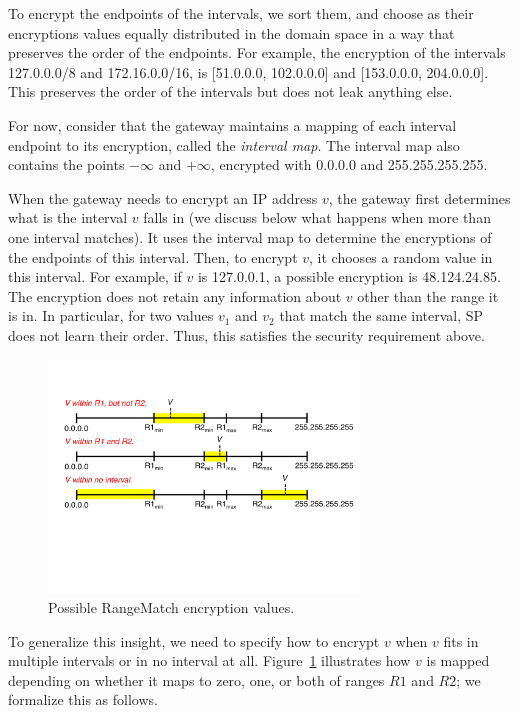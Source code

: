 To encrypt the endpoints of the intervals, we sort them, and choose as their encryptions values equally distributed in the domain space in a way that preserves the order of the endpoints. For example, the encryption of the intervals 127.0.0.0/8 and 172.16.0.0/16, is [51.0.0.0, 102.0.0.0] and [153.0.0.0, 204.0.0.0]. This preserves the order of the intervals but does not leak anything else.

For now, consider that the gateway  maintains a mapping of each interval endpoint  to its encryption, called the {\em interval map}.  The interval map also contains the points $- \infty$ and $+ \infty$, encrypted with 0.0.0.0 and 255.255.255.255. 


When the gateway needs to encrypt an IP address $v$, the gateway first determines what  is the interval  $v$ falls in (we discuss below what happens when more than one interval matches). It uses the interval map to determine the encryptions of the endpoints of this interval. Then, to encrypt $v$, it chooses a random value in this interval.
For example, if $v$ is 127.0.0.1, a possible encryption is 48.124.24.85. The encryption does not retain any information about $v$ other than the range it is in. In particular, for two values $v_1$ and $v_2$ that match the same interval, SP does not learn their order. Thus, this satisfies the security requirement above.

\begin{figure}[t]
  \centering
  \includegraphics[width=3.25in]{fig/rangeopts.pdf}
  \caption[]{Possible RangeMatch encryption values.\label{fig:rangeopts}}
\end{figure}
To generalize this insight, we need to specify how to encrypt $v$ when $v$ fits in multiple intervals or in no interval at all. Figure~\ref{fig:rangeopts} illustrates how $v$ is mapped depending on whether it maps to zero, one, or both of ranges $R1$ and $R2$; we formalize this as follows. 

